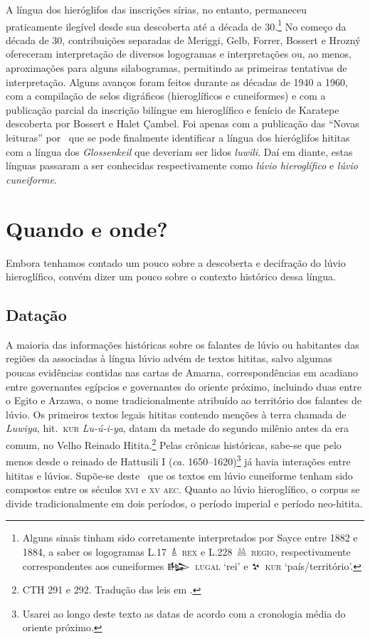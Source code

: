 A língua dos hieróglifos das inscrições sírias, no entanto, permaneceu
praticamente ilegível desde sua descoberta até a década de 30.\footnote{Alguns
	sinais tinham sido corretamente interpretados por Sayce entre 1882 e 1884, a
	saber os logogramas \mbox{L.17 𔐑 \textsc{rex}} e \mbox{L.228 𔔆 \textsc{regio}},
	respectivamente correspondentes aos cuneiformes
	\mbox{\foreignlanguage{hittite}{𒈗} \textsc{lugal}} `rei' e \mbox{\foreignlanguage{hittite}{𒆳} \textsc{kur}}
	`país\slash{}território'.}
No começo da década de 30, contribuições separadas de Meriggi, Gelb, Forrer,
Bossert e Hrozný ofereceram interpretação de diversos logogramas e
interpretações ou, ao menos, aproximações para alguns silabogramas,
permitindo as primeiras tentativas de interpretação.
Alguns avanços foram feitos durante as décadas de 1940 a 1960, com a compilação
de selos digráficos (hieroglíficos e cuneiformes) e com a publicação parcial da
inscrição bilíngue em hieroglífico e fenício de Karatepe descoberta por
Bossert e Halet Çambel.
Foi apenas com a publicação das ``Novas leituras''
por~\textcite{HawkinsMorpurgoNeumann1974} que se pode finalmente identificar a
língua dos hieróglifos hititas com a língua dos
\emph{\foreignlanguage{german}{Glossenkeil}} que deveriam
ser lidos \emph{luwili}.
Daí em diante, estas línguas passaram a ser conhecidas respectivamente como
\emph{lúvio hieroglífico} e \emph{lúvio cuneiforme}.

\chapter{Quando e onde?}

Embora tenhamos contado um pouco sobre a descoberta e decifração do lúvio
hieroglífico, convém dizer um pouco sobre o contexto histórico dessa língua.

\section{Datação}
A maioria das informações históricas sobre os falantes de lúvio ou habitantes
das regiões da associadas à língua lúvio advém de textos hititas, salvo algumas
poucas evidências contidas nas cartas de Amarna, correspondências em acadiano
entre governantes egípcios e governantes do oriente próximo, incluindo duas
entre o Egito e Arzawa, o nome tradicionalmente atribuído ao território dos
falantes de lúvio.
Os primeiros textos legais hititas contendo menções à
terra chamada de \emph{Luwiya}, hit.\ \mbox{\textsc{kur}} \mbox{\textit{Lu-ú-i-ya}},
datam da metade do segundo milênio antes da era comum, no Velho Reinado
Hitita.\footnote{CTH 291 e 292. Tradução das leis em \textcite{Hoffner1997}.}
Pelas crônicas históricas, sabe-se que pelo menos desde o reinado de Hattusili I
(\emph{ca.} 1650--1620)\footnote{Usarei ao longo deste texto as datas de acordo
	com a cronologia média do oriente próximo.} já havia interações entre hititas
e lúvios.
Supõe-se deste~\textcite{Starke1985} que os textos em lúvio cuneiforme tenham
sido compostos entre os séculos \textsc{xvi} e \textsc{xv} \textsc{aec}.
Quanto ao lúvio hieroglífico, o corpus se divide tradicionalmente em dois
períodos, o período imperial e período neo-hitita.

